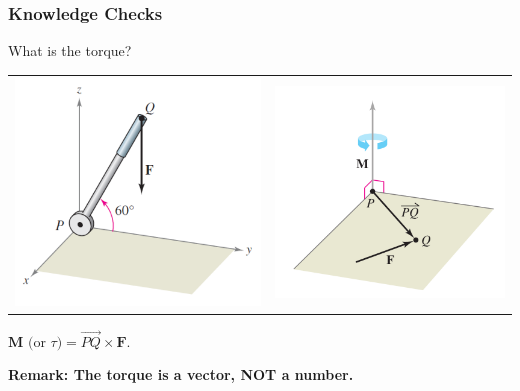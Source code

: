 \documentclass[10pt]{beamer}
\begin{document}
\begin{frame}
\frametitle{Knowledge Checks}
What is the torque?
\begin{tabular}{cc}
\includegraphics[width = .5\textwidth]{example4fig.png}&
\includegraphics[width = .5\textwidth]{torque.png}
\end{tabular}\pause
\begin{tcolorbox}
$\mathbf M\text{ (or ${\tau}$)} = \overrightarrow{PQ}\times\mathbf F.$
\end{tcolorbox}
\pause
{\bf Remark: The torque is a vector, NOT a number.}
\end{frame}
\end{document}
